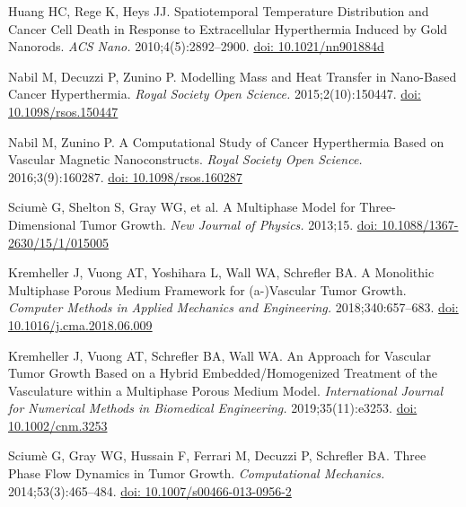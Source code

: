 \documentclass[Times1COL,AMA]{WileyNJDv5} %
\begin{document}
\begin{thebibliography}{10}
    Huang HC, Rege K, Heys JJ. Spatiotemporal {{Temperature Distribution}} and
        {{Cancer Cell Death}} in {{Response}} to {{Extracellular Hyperthermia
                    Induced}} by {{Gold Nanorods}}. {\it ACS Nano.}
    2010\string;4(5)\string:2892--2900.
    \newblock \href {\doibase 10.1021/nn901884d} {doi: 10.1021/nn901884d}

    Nabil M, Decuzzi P, Zunino P. Modelling Mass and Heat Transfer in Nano-Based
    Cancer Hyperthermia. {\it Royal Society Open Science.}
    2015\string;2(10)\string:150447.
    \newblock \href {\doibase 10.1098/rsos.150447} {doi: 10.1098/rsos.150447}

    Nabil M, Zunino P. A Computational Study of Cancer Hyperthermia Based on
    Vascular Magnetic Nanoconstructs. {\it Royal Society Open Science.}
    2016\string;3(9)\string:160287.
    \newblock \href {\doibase 10.1098/rsos.160287} {doi: 10.1098/rsos.160287}

    Scium{\`e} G, Shelton S, Gray WG, et al. A Multiphase Model for
    Three-Dimensional Tumor Growth. {\it New Journal of Physics.} 2013\string;15.
    \newblock \href {\doibase 10.1088/1367-2630/15/1/015005} {doi:
        10.1088/1367-2630/15/1/015005}

    Kremheller J, Vuong AT, Yoshihara L, Wall WA, Schrefler BA. A Monolithic
    Multiphase Porous Medium Framework for (a-)Vascular Tumor Growth. {\it
            Computer Methods in Applied Mechanics and Engineering.}
    2018\string;340\string:657--683.
    \newblock \href {\doibase 10.1016/j.cma.2018.06.009} {doi:
        10.1016/j.cma.2018.06.009}

    Kremheller J, Vuong AT, Schrefler BA, Wall WA. An Approach for Vascular Tumor
    Growth Based on a Hybrid Embedded/Homogenized Treatment of the Vasculature
    within a Multiphase Porous Medium Model. {\it International Journal for
            Numerical Methods in Biomedical Engineering.}
    2019\string;35(11)\string:e3253.
    \newblock \href {\doibase 10.1002/cnm.3253} {doi: 10.1002/cnm.3253}

    Scium{\`e} G, Gray WG, Hussain F, Ferrari M, Decuzzi P, Schrefler BA. Three
    Phase Flow Dynamics in Tumor Growth. {\it Computational Mechanics.}
    2014\string;53(3)\string:465--484.
    \newblock \href {\doibase 10.1007/s00466-013-0956-2} {doi:
        10.1007/s00466-013-0956-2}


\end{thebibliography}
\end{document}

